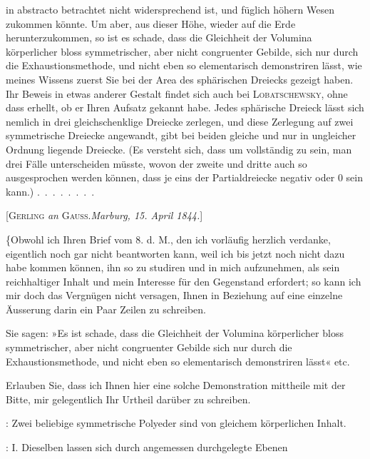 %
\noindent in abstracto betrachtet nicht widersprechend ist, und füglich höhern Wesen
zukommen könnte. Um aber, aus dieser Höhe, wieder auf die Erde
herunterzukommen, so ist es schade, dass die Gleichheit der Volumina
körperlicher bloss symmetrischer, aber nicht congruenter Gebilde, sich nur
durch die Exhaustionsmethode, und nicht eben so elementarisch demonstriren
lässt, wie meines Wissens zuerst Sie bei der Area des sphärischen Dreiecks
gezeigt haben. Ihr Beweis in etwas anderer Gestalt findet sich auch bei
\textsc{Lobatschewsky}, ohne dass erhellt, ob er Ihren Aufsatz gekannt habe.
Jedes sphärische Dreieck lässt sich nemlich in drei gleichschenklige
Dreiecke zerlegen, und diese Zerlegung auf zwei symmetrische Dreiecke
angewandt, gibt bei beiden gleiche und nur in ungleicher Ordnung liegende
Dreiecke. (Es versteht sich, dass um vollständig zu sein, man drei Fälle
unterscheiden müsste, wovon der zweite und dritte auch so ausgesprochen
werden können, dass je eins der Partialdreiecke negativ oder 0 sein kann.)
\mbox{.\ .\ .\ .\ .\ .\ .\ .}

\par\bigskip

\begin{center}
[\textsc{Gerling} \emph{an} \textsc{Gauss}.\quad \emph{Marburg, 15. April 1844.}]
\end{center}

\{Obwohl ich Ihren Brief vom 8. d. M., den ich vorläufig herzlich verdanke,
eigentlich noch gar nicht beantworten kann, weil ich bis jetzt noch nicht
dazu habe kommen können, ihn so zu studiren und in mich aufzunehmen, als
sein reichhaltiger Inhalt und mein Interesse für den Gegenstand erfordert;
so kann ich mir doch das Vergnügen nicht versagen, Ihnen in Beziehung auf
eine einzelne Äusserung darin ein Paar Zeilen zu schreiben.

Sie sagen: »Es ist schade, dass die Gleichheit der Volumina körperlicher
bloss symmetrischer, aber nicht congruenter Gebilde sich nur durch die
Exhaustionsmethode, und nicht eben so elementarisch demonstriren lässt«
etc.

Erlauben Sie, dass ich Ihnen hier eine solche Demonstration mittheile mit
der Bitte, mir gelegentlich Ihr Urtheil darüber zu schreiben.

: Zwei beliebige symmetrische Polyeder sind von gleichem
körperlichen Inhalt.

: I. Dieselben lassen sich durch angemessen durchgelegte Ebenen
